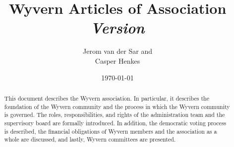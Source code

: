 \documentclass[a4paper]{article}
\title{
    Wyvern Articles of Association\\
    \vspace{10px}
    \large \textit{Version \versionnumber}
}
\author{
    Jerom van der Sar and\\
    Casper Henkes
}
\date{\today}
\begin{document}
\begin{titlepage}
    \maketitle
    \begin{abstract}
        This document describes the Wyvern association. In particular, it describes the foundation of the Wyvern community and the process in which the Wyvern community is governed. The roles, responsibilities, and rights of the administration team and the supervisory board are formally introduced. In addition, the democratic voting process is described, the financial obligations of Wyvern members and the association as a whole are discussed, and lastly, Wyvern committees are presented.
    \end{abstract}
\end{titlepage}






\end{document}
